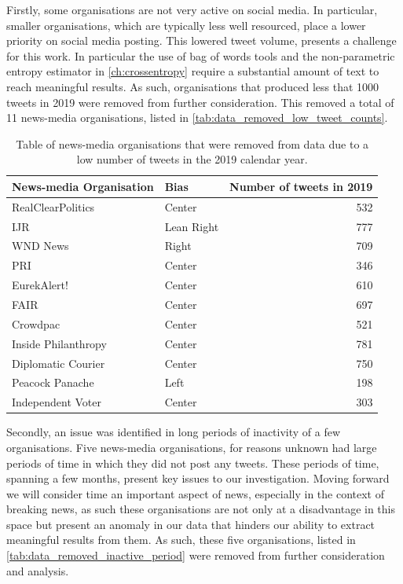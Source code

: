 Firstly, some organisations are not very active on social media. In particular, smaller organisations, which are typically less well resourced, place a lower priority on social media posting. This lowered tweet volume, presents a challenge for this work. In particular the use of bag of words tools and the non-parametric entropy estimator in \autoref{ch:crossentropy} require a substantial amount of text to reach meaningful results. As such, organisations that produced less that 1000 tweets in 2019 were removed from further consideration. This removed a total of 11 news-media organisations, listed in  \autoref{tab:data_removed_low_tweet_counts}.


\begin{table} 
	\centering
	\begin{tabular}{llr}
		\toprule
		News-media Organisation &    Bias  &  Number of tweets in 2019\\
		\midrule
		RealClearPolitics &      Center &  532 \\
		IJR  &  Lean Right &  777 \\
		WND News &         Right &  709 \\
		PRI &                Center &  346 \\
		EurekAlert! &            Center &  610 \\
		FAIR &     Center &  697 \\
		Crowdpac &            Center &  521 \\
		Inside Philanthropy &        Center &  781 \\
		Diplomatic Courier &         Center &  750 \\
		Peacock Panache &          Left &  198 \\
		Independent Voter &            Center &  303 \\
		\bottomrule
	\end{tabular}
\caption{Table of news-media organisations that were removed from data due to a low number of tweets in the 2019 calendar year.}
\label{tab:data_removed_low_tweet_counts}
\end{table}

Secondly, an issue was identified in long periods of inactivity of a few organisations. Five news-media organisations, for reasons unknown had large periods of time in which they did not post any tweets. These periods of time, spanning a few months, present key issues to our investigation. Moving forward we will consider time an important aspect of news, especially in the context of breaking news, as such these organisations are not only at a disadvantage in this space but present an anomaly in our data that hinders our ability to extract meaningful results from them. As such, these five organisations, listed in \autoref{tab:data_removed_inactive_period} were removed from further consideration and analysis.

